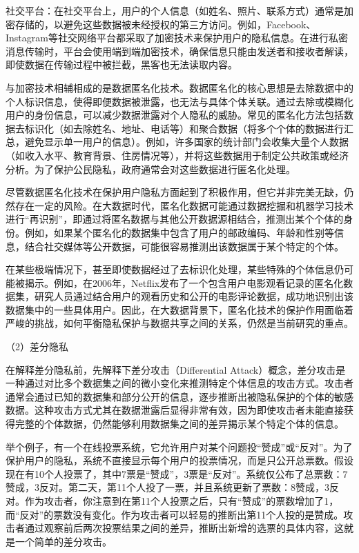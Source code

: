 社交平台：在社交平台上，用户的个人信息（如姓名、照片、联系方式）通常是加密存储的，以避免这些数据被未经授权的第三方访问。例如，Facebook、Instagram等社交网络平台都采取了加密技术来保护用户的隐私信息。在进行私密消息传输时，平台会使用端到端加密技术，确保信息只能由发送者和接收者解读，即使数据在传输过程中被拦截，黑客也无法读取内容。

与加密技术相辅相成的是数据匿名化技术。数据匿名化的核心思想是去除数据中的个人标识信息，使得即便数据被泄露，也无法与具体个体关联。通过去除或模糊化用户的身份信息，可以减少数据泄露对个人隐私的威胁。常见的匿名化方法包括数据去标识化（如去除姓名、地址、电话等）和聚合数据（将多个个体的数据进行汇总，避免显示单一用户的信息）。例如，许多国家的统计部门会收集大量个人数据（如收入水平、教育背景、住房情况等），并将这些数据用于制定公共政策或经济分析。为了保护公民隐私，政府通常会对这些数据进行匿名化处理。

尽管数据匿名化技术在保护用户隐私方面起到了积极作用，但它并非完美无缺，仍然存在一定的风险。在大数据时代，匿名化数据可能通过数据挖掘和机器学习技术进行“再识别”，即通过将匿名数据与其他公开数据源相结合，推测出某个个体的身份。例如，如果某个匿名化的数据集中包含了用户的邮政编码、年龄和性别等信息，结合社交媒体等公开数据，可能很容易推测出该数据属于某个特定的个体。

在某些极端情况下，甚至即使数据经过了去标识化处理，某些特殊的个体信息仍可能被揭示。例如，在2006年，Netflix发布了一个包含用户电影观看记录的匿名化数据集，研究人员通过结合用户的观看历史和公开的电影评论数据，成功地识别出该数据集中的一些具体用户。因此，在大数据背景下，匿名化技术的保护作用面临着严峻的挑战，如何平衡隐私保护与数据共享之间的关系，仍然是当前研究的重点。

（2）差分隐私

在解释差分隐私前，先解释下差分攻击（Differential Attack）概念，差分攻击是一种通过对比多个数据集之间的微小变化来推测特定个体信息的攻击方式。攻击者通常会通过已知的数据集和部分公开的信息，逐步推断出被隐私保护的个体的敏感数据。这种攻击方式尤其在数据泄露后显得非常有效，因为即使攻击者未能直接获得完整的个体数据，仍然能够利用数据集之间的差异揭示某个特定个体的信息。

举个例子，有一个在线投票系统，它允许用户对某个问题投“赞成”或“反对”。为了保护用户的隐私，系统不直接显示每个用户的投票情况，而是只公开总票数。假设现在有10个人投票了，其中7票是“赞成”，3票是“反对”。系统仅公布了总票数：7赞成，3反对。第二天，第11个人投了一票，并且系统更新了票数：8赞成，3反对。作为攻击者，你注意到在第11个人投票之后，只有“赞成”的票数增加了1，而“反对”的票数没有变化。作为攻击者可以轻易的推断出第11个人投的是赞成。攻击者通过观察前后两次投票结果之间的差异，推断出新增的选票的具体内容，这就是一个简单的差分攻击。

